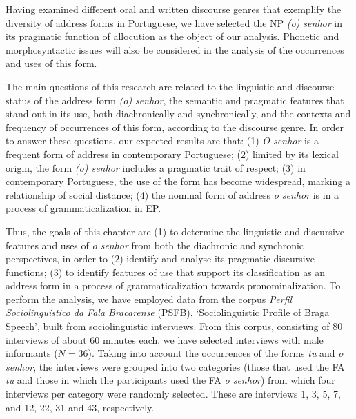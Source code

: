 \documentclass[output=paper]{langscibook}
\begin{document}
Having examined different oral and written discourse genres that exemplify the diversity of address forms in Portuguese, we have selected the NP \textit{(o) senhor} in its pragmatic function of allocution as the object of our analysis. Phonetic and morphosyntactic issues will also be considered in the analysis of the occurrences and uses of this form.



The main questions of this research are related to the linguistic and discourse status of the address form \textit{(o) senhor}, the semantic and pragmatic features that stand out in its use, both diachronically and synchronically, and the contexts and frequency of occurrences of this form, according to the discourse genre. In order to answer these questions, our expected results are that: (1) \textit{O senhor} is a frequent form of address in contemporary Portuguese; (2) limited by its lexical origin, the form \textit{(o) senhor} includes a pragmatic trait of respect; (3) in contemporary Portuguese, the use of the form has become widespread, marking a relationship of social distance; (4) the nominal form of address \textit{o senhor} is in a process of grammaticalization in EP.



Thus, the goals of this chapter are (1) to determine the linguistic and discursive features and uses of \textit{o senhor} from both the diachronic and synchronic perspectives, in order to (2) identify and analyse its pragmatic{}-discursive functions; (3) to identify features of use that support its classification as an address form in a process of grammaticalization towards pronominalization. To perform the analysis, we have employed data from the corpus \textit{Perfil Sociolinguístico da Fala Bracarense} (PSFB), ‘Sociolinguistic Profile of Braga Speech’, built from sociolinguistic interviews. From this corpus, consisting of 80 interviews of about 60 minutes each, we have selected interviews with male informants ($N = 36$). Taking into account the occurrences of the forms \textit{tu} and \textit{o senhor}, the interviews were grouped into two categories (those that used the FA \textit{tu} and those in which the participants used the FA \textit{o senhor}) from which four interviews per category were randomly selected. These are interviews 1, 3, 5, 7, and 12, 22, 31 and 43, respectively. 
\end{document}
